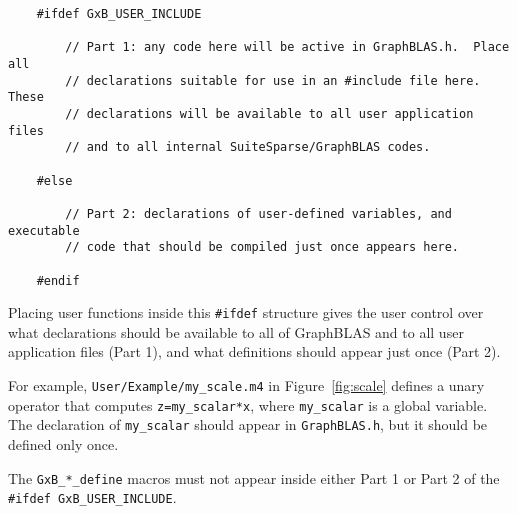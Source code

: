 \documentclass[12pt]{article}
\begin{document}
{\footnotesize
\begin{verbatim}
    #ifdef GxB_USER_INCLUDE

        // Part 1: any code here will be active in GraphBLAS.h.  Place all
        // declarations suitable for use in an #include file here.  These
        // declarations will be available to all user application files
        // and to all internal SuiteSparse/GraphBLAS codes.

    #else

        // Part 2: declarations of user-defined variables, and executable
        // code that should be compiled just once appears here.

    #endif \end{verbatim}}

\noindent
Placing user functions inside this \verb'#ifdef' structure gives the user
control over what declarations should be available to all of GraphBLAS and to
all user application files (Part 1), and what definitions should appear just
once (Part 2).

\newpage
For example, \verb'User/Example/my_scale.m4' in
Figure~\ref{fig:scale} defines a unary operator that computes
\verb'z=my_scalar*x', where \verb'my_scalar' is a global variable.
The declaration of \verb'my_scalar' should appear in \verb'GraphBLAS.h', but
it should be defined only once.

The \verb'GxB_*_define' macros must not appear inside either Part 1 or Part 2
of the \verb'#ifdef GxB_USER_INCLUDE'.
\end{document}
